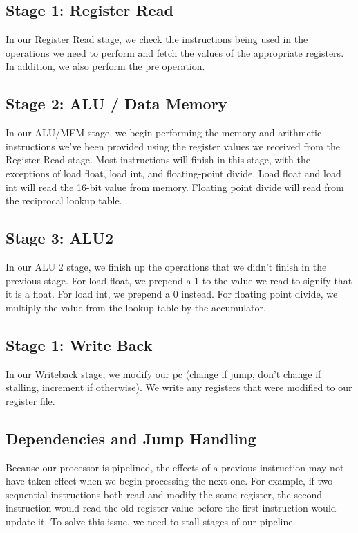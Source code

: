 \documentclass[sigconf]{acmart}
\begin{document}
\subsection{Stage 1: Register Read}
In our Register Read stage, we check the instructions being used in the operations we need to perform and fetch the values of the appropriate registers. In addition, we also perform the pre operation.

\subsection{Stage 2: ALU / Data Memory}
In our ALU/MEM stage, we begin performing the memory and arithmetic instructions we’ve been provided using the register values we received from the Register Read stage. Most instructions will finish in this stage, with the exceptions of load float, load int, and floating-point divide. Load float and load int will read the 16-bit value from memory. Floating point divide will read from the reciprocal lookup table.

\subsection{Stage 3: ALU2}
In our ALU 2 stage, we finish up the operations that we didn’t finish in the previous stage. For load float, we prepend a 1 to the value we read to signify that it is a float. For load int, we prepend a 0 instead. For floating point divide, we multiply the value from the lookup table by the accumulator.

\subsection{Stage 1: Write Back}
In our Writeback stage, we modify our pc (change if jump, don’t change if stalling, increment if otherwise). We write any registers that were modified to our register file.

\subsection{Dependencies and Jump Handling}
Because our processor is pipelined, the effects of a previous instruction may not have taken effect when we begin processing the next one. For example, if two sequential instructions both read and modify the same register, the second instruction would read the old register value before the first instruction would update it. To solve this issue, we need to stall stages of our pipeline.
\end{document}
